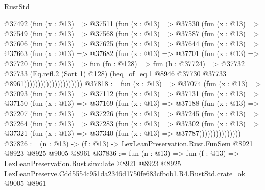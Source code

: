 \begin{lexlean}{RustStd}
\begin{coremodule}
                @37492
                  (fun (x : @13) =>
                  @37511
                    (fun (x : @13) =>
                    @37530
                      (fun (x : @13) =>
                      @37549
                        (fun (x : @13) =>
                        @37568
                          (fun (x : @13) =>
                          @37587
                            (fun (x : @13) =>
                            @37606
                              (fun (x : @13) =>
                              @37625
                                (fun (x : @13) =>
                                @37644
                                  (fun (x : @13) =>
                                  @37663
                                    (fun (x : @13) =>
                                    @37682
                                      (fun (x : @13) =>
                                      @37701
                                        (fun (x : @13) =>
                                        @37720
                                          (fun (x : @13) =>
                                          fun (fn : @128) =>
                                          fun (h : @37724) =>
                                          @37732
                                            @37733
                                            (Eq.refl.{2} (Sort 1) @128)
                                            (heq_of_eq.{1}
                                              @8946
                                              @37730
                                              @37733
                                              @8961)))))))))))))))))))))
@37818 := fun (x : @13) =>
  @37074
    (fun (x : @13) =>
    @37093
      (fun (x : @13) =>
      @37112
        (fun (x : @13) =>
        @37131
          (fun (x : @13) =>
          @37150
            (fun (x : @13) =>
            @37169
              (fun (x : @13) =>
              @37188
                (fun (x : @13) =>
                @37207
                  (fun (x : @13) =>
                  @37226
                    (fun (x : @13) =>
                    @37245
                      (fun (x : @13) =>
                      @37264
                        (fun (x : @13) =>
                        @37283
                          (fun (x : @13) =>
                          @37302
                            (fun (x : @13) =>
                            @37321 (fun (x : @13) => @37340 (fun (x : @13) => @37787)))))))))))))))
@37826 := (n : @13) -> (f : @13) -> LexLeanPreservation.Rust.FunSem @8921 @8923 @8925 @9005 @8961
@37836 := fun (n : @13) =>
  fun (f : @13) =>
  LexLeanPreservation.Rust.simulate
    @8921
    @8923
    @8925
    LexLeanPreserve.Cdd5554c951da2346d1750fe683cfbcb1.R4.RustStd.crate_ok
    @9005
    @8961
\end{coremodule}
\end{lexlean}
